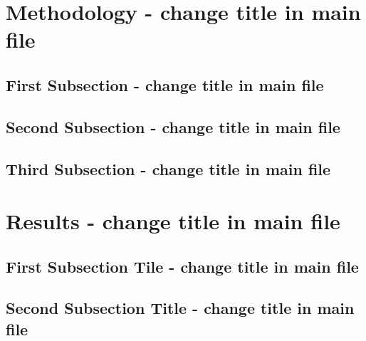 \documentclass[12pt]{article}
\begin{document}
\begin{spacing}{1}
\end{spacing}


\begin{spacing}{1.5}
\section{Methodology - change title in main file} 

\subsection{First Subsection - change title in main file}  

\subsection{Second Subsection - change title in main file} 

\subsection{Third Subsection - change title in main file} 



\bigskip



\section{Results - change title in main file}

\subsection{First Subsection Tile - change title in main file}

\subsection{Second Subsection Title - change title in main file}


\end{spacing}
\end{document}
